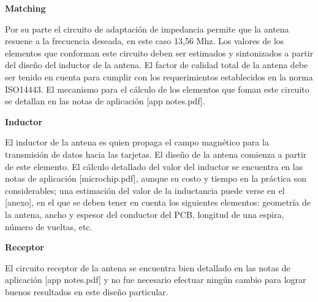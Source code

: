 \bigskip
{\bf{Matching}}

Por su parte el circuito de adaptación de impedancia permite que la antena resuene a la frecuencia deseada, en este caso 13,56 Mhz. Los valores de los elementos que conforman este circuito deben ser estimados y sintonizados a partir del diseño del inductor de la antena.
El factor de calidad total de la antena debe ser tenido en cuenta para cumplir con los requerimientos establecidos en la norma ISO14443. 
El mecanismo para el cálculo de los elementos que foman este circuito se detallan en las notas de aplicación [app notes.pdf].

\bigskip
{\bf{Inductor}}

El inductor de la antena es quien propaga el campo magnético para la transmisión de datos hacia las tarjetas. El diseño de la antena comienza a partir de este elemento.
El cálculo detallado del valor del inductor se encuentra en las notas de aplicación [microchip.pdf], aunque su costo y tiempo en la práctica son considerables; una estimación del valor de la inductancia puede verse en el [anexo], en el que se deben tener en cuenta los siguientes elementos: geometría de la antena, ancho y espesor del conductor del PCB, longitud de una espira, número de vueltas, etc.

\bigskip
{\bf{Receptor}} 

El circuito receptor de la antena se encuentra bien detallado en las notas de aplicación [app notes.pdf] y no fue necesario efectuar ningún cambio para lograr buenos resultados en este diseño particular. 